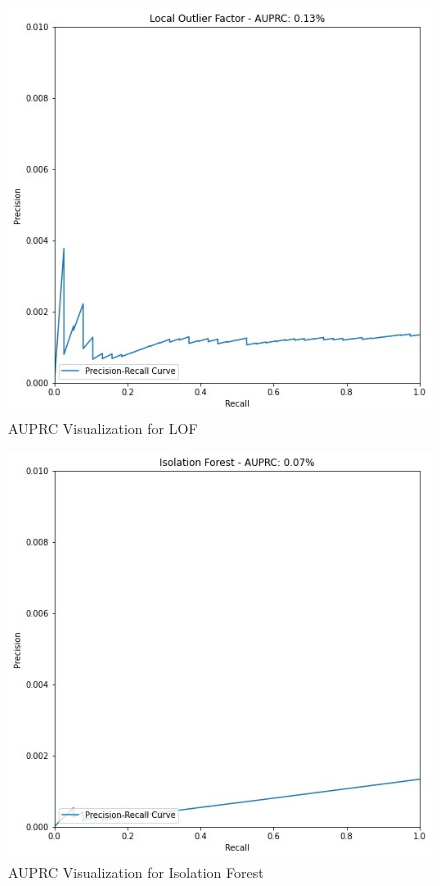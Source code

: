 \documentclass[journal]{IEEEtran}
\begin{document}
\begin{figure}[h]
    \centering
    \includegraphics[width=0.8\linewidth]{LOF.jpg}
    \caption{AUPRC Visualization for LOF}
    \label{fig:lof}
\end{figure}

\begin{figure}[h]
    \centering
    \includegraphics[width=0.8\linewidth]{isolation.jpg}
    \caption{AUPRC Visualization for Isolation Forest}
    \label{fig:isolation}
\end{figure}
\end{document}
